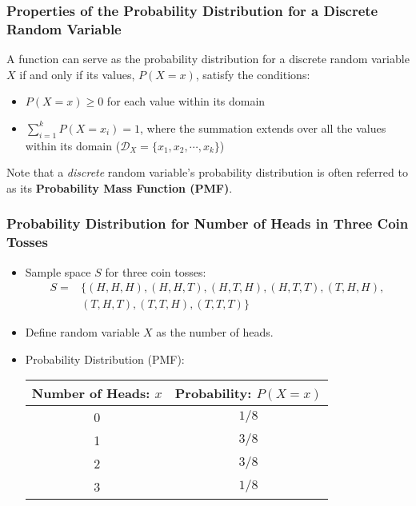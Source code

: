\documentclass[handout]{beamer} %
\begin{document}

\begin{frame}
\frametitle{Properties of the Probability Distribution for a Discrete Random Variable}

A function can serve as the probability distribution for a discrete random variable \( X \) if and only if its values, \( P(X=x) \), satisfy the conditions:
\pause  \vspace{1.0em}
    \begin{itemize}
        \item \( P(X=x) \geq 0 \) for each value within its domain \pause \vspace{1.0em}
        \item \( \sum_{i =1}^{k} P(X=x_i) = 1 \), where the summation extends over all the values within its domain ($\mathcal{D}_X = \{x_1, x_2, \cdots, x_k\}$) \pause \vspace{1.0em}
    \end{itemize}

Note that a \emph{discrete} random variable's probability distribution is often referred to as its \textbf{Probability Mass Function (PMF)}.

\end{frame}


\begin{frame}
    \frametitle{Probability Distribution for Number of Heads in Three Coin Tosses}
    \begin{itemize}
        \item Sample space \( S \) for three coin tosses: \pause
        \begin{align*}
        S =& \big\{ (H, H, H), (H, H, T), (H, T, H), (H, T, T), (T, H, H), \\\
        & (T, H, T), (T, T, H), (T, T, T) \big\}
        \end{align*} 
        \vspace{-1.7em}
        \pause
        \item Define random variable \( X \) as the number of heads. \pause
        \item Probability Distribution (PMF): 
        \begin{table}
            \centering
            \begin{tabular}{|c|c|}
                \hline
                \textbf{Number of Heads: $x$} & \textbf{Probability: $P(X=x)$} \\
                \hline
                0 & \( 1/8 \) \pause \\
                1 & \( 3/8 \) \pause \\
                2 & \( 3/8 \) \pause \\
                3 & \( 1/8 \) \pause \\
                \hline
            \end{tabular}
        \end{table}
    \end{itemize}
\end{frame}
\end{document}

